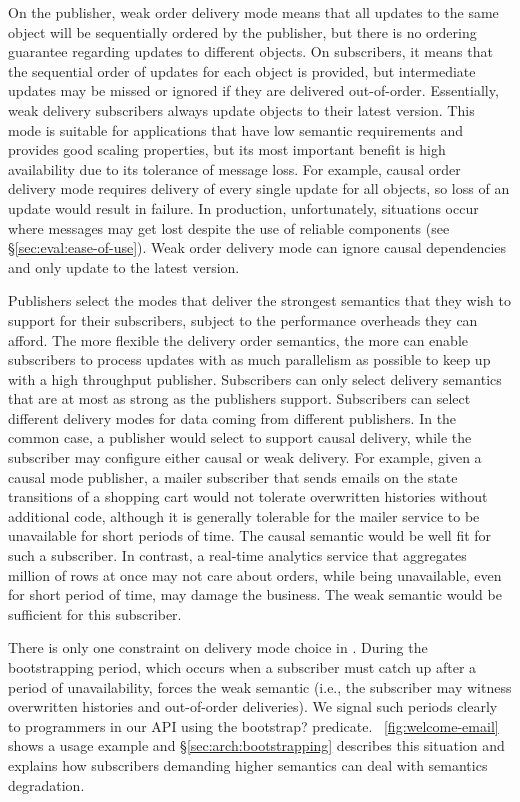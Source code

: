 On the publisher, weak order delivery mode means that all updates to the
same object will be sequentially ordered by the publisher, but there
is no ordering guarantee regarding updates to different objects.  On
subscribers, it means that the sequential order of updates for each 
object is provided, but intermediate updates may be
missed or ignored if they are delivered out-of-order.  Essentially,
weak delivery subscribers always update objects to their
latest version.  
This mode is suitable for applications that have low semantic
requirements and provides good scaling properties, but its
most important benefit is high availability due to its tolerance of
message loss.  For example, causal order delivery mode 
requires delivery of every single update for all objects, so loss
of an update would result in failure.  In production, unfortunately,
situations occur where messages may get lost despite the use of
reliable components (see \S\ref{sec:eval:ease-of-use}).  Weak
order delivery mode can ignore causal dependencies and only update
to the latest version.

Publishers select the modes that deliver the strongest semantics that
they wish to support for their subscribers, subject to the performance
overheads they can afford.  The more flexible the delivery order
semantics, the more \synapse can enable subscribers to process updates
with as much parallelism as possible to keep up with a high throughput
publisher.  Subscribers can only select delivery
semantics that are at most as strong as the publishers support.
Subscribers can select different delivery modes for data coming
from different publishers.  In the common case,
a publisher would select to support causal delivery, while the
subscriber may configure either causal or weak delivery. For example,
given a causal mode publisher, a mailer subscriber that sends emails
on the state transitions of a shopping cart would not tolerate
overwritten histories without additional code, although it is
generally tolerable for the mailer service to be unavailable for short
periods of time. The causal semantic would be well fit for
such a subscriber.  In contrast, a real-time analytics service that
aggregates million of rows at once may not care about orders, while
being unavailable, even for short period of time, may damage the
business.  The weak semantic would be sufficient for this subscriber.

There is only one constraint on delivery mode choice in
\synapse.  During the bootstrapping period, which occurs when a
subscriber must catch up after a period of unavailability, \synapse
forces the weak semantic (i.e., the subscriber may witness overwritten
histories and out-of-order deliveries).  We signal such periods
clearly to programmers in our API using the {\code bootstrap?}
predicate. \F~\ref{fig:welcome-email} shows a usage example and
\S\ref{sec:arch:bootstrapping} describes this situation and
explains how subscribers demanding higher semantics can deal with semantics
degradation.
